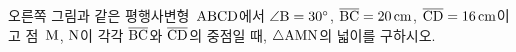 \noindent\begin{minipage}[t]{0.58\linewidth}\vspace{0pt}\raggedright 오른쪽 그림과 같은 평행사변형~$\mathrm{ABCD}$에서 $\angle\mathrm{B}=30^\circ$, $\overline{\mathrm{BC}}=20\,\mathrm{cm}$, $\overline{\mathrm{CD}}=16\,\mathrm{cm}$이고 점~$\mathrm{M}$, $\mathrm{N}$이 각각 $\overline{\mathrm{BC}}$와 $\overline{\mathrm{CD}}$의 중점일 때, $\triangle\mathrm{AMN}$의 넓이를 구하시오.\end{minipage}\hfill\begin{minipage}[t]{0.4\linewidth}\vspace{0pt}\centering \resizebox{\ifdim\width>\linewidth\linewidth\else\width\fi}{!}{}\end{minipage}\par
